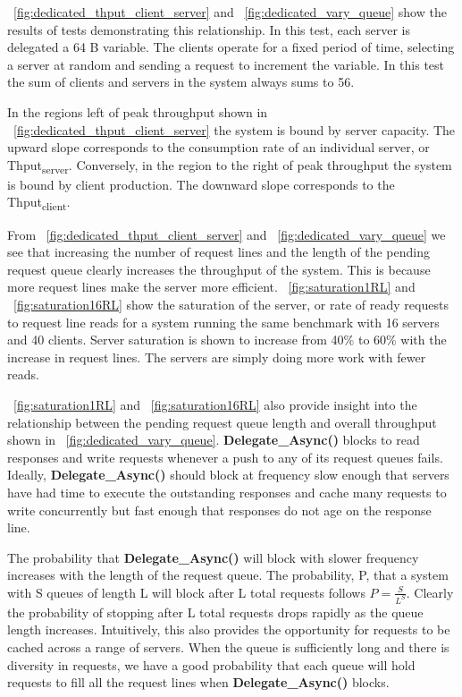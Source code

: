 \documentclass{uicthesi}
\begin{document}
~\ref{fig:dedicated_thput_client_server} and ~\ref{fig:dedicated_vary_queue} show the results of tests demonstrating this relationship. In this test, each server is delegated a 64 B variable. The clients operate for a fixed period of time, selecting a server at random and sending a request to increment the variable. In this test the sum of clients and servers in the system always sums to 56.

In the regions left of peak throughput shown in  ~\ref{fig:dedicated_thput_client_server} the system is bound by server capacity. The upward slope corresponds to the consumption rate of an individual server, or Thput\textsubscript{server}. Conversely, in the region to the right of peak throughput the system is bound by client production. The downward slope corresponds to the Thput\textsubscript{client}. 

From ~\ref{fig:dedicated_thput_client_server} and ~\ref{fig:dedicated_vary_queue} we see that increasing the number of request lines and the length of the pending request queue clearly increases the throughput of the system. This is because more request lines make the server more efficient. ~\ref{fig:saturation1RL} and ~\ref{fig:saturation16RL} show the saturation of the server, or rate of ready requests to request line reads for a system running the same benchmark with 16 servers and 40 clients. Server saturation is shown to increase from 40\% to 60\% with the increase in request lines. The servers are simply doing more work with fewer reads. 

~\ref{fig:saturation1RL} and ~\ref{fig:saturation16RL} also provide insight into the relationship between the pending request queue length and overall throughput shown in ~\ref{fig:dedicated_vary_queue}. \textbf{Delegate\_Async()} blocks to read responses and write requests whenever a push to any of its request queues fails. Ideally, \textbf{Delegate\_Async()} should block at frequency slow enough that servers have had time to execute the outstanding responses and cache many requests to write concurrently but fast enough that responses do not age on the response line. 

The probability that \textbf{Delegate\_Async()} will block with slower frequency increases with the length of the request queue. The probability, P, that a system with S queues of length L will block after L total requests follows $ P = \frac{S}{L^{S}} $. Clearly the probability of stopping after L total requests drops rapidly as the queue length increases. Intuitively, this also provides the opportunity for requests to be cached across a range of servers. When the queue is sufficiently long and there is diversity in requests, we have a good probability that each queue will hold requests to fill all the request lines when \textbf{Delegate\_Async()} blocks. 
\end{document}
